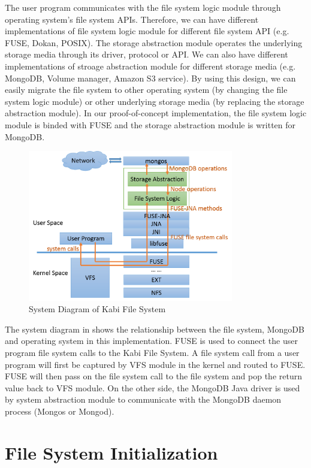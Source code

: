     The user program communicates with the file system logic module through operating system's file system APIs. Therefore, we can have different implementations of file system logic module for different file system API (e.g. FUSE, Dokan, POSIX). The storage abstraction module operates the underlying storage media through its driver, protocol or API. We can also have different implementations of stroage abstraction module for different storage media (e.g. MongoDB, Volume manager, Amazon S3 service). By using this design, we can easily migrate the file system to other operating system (by changing the file system logic module) or other underlying storage media (by replacing the storage abstraction module). In our proof-of-concept implementation, the file system logic module is binded with FUSE and the storage abstraction module is written for MongoDB. 

\begin{figure}[hbtp]
\centering
\includegraphics[width=0.8\textwidth]{Chapter-3/figs/fig1.png}
\caption{System Diagram of Kabi File System}
\label{fig:diagram}
\end{figure}

    The system diagram in  shows the relationship between the file system, MongoDB and operating system in this implementation. FUSE is used to connect the user program file system calls to the Kabi File System. A file system call from a user program will first be captured by VFS module in the kernel and routed to FUSE. FUSE will then pass on the file system call to the file system and pop the return value back to VFS module. On the other side, the MongoDB Java driver is used by system abstraction module to communicate with the MongoDB daemon process (Mongos or Mongod).

\section{File System Initialization}

